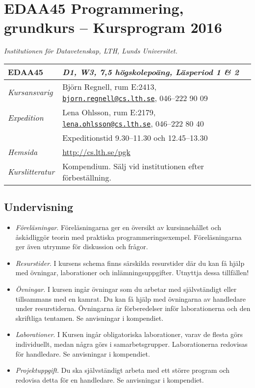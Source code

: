 \documentclass[a4paper,12pt,oneside]{memoir}
\newcommand{\YEAR}{2016}
\begin{document}
\section*{EDAA45 Programmering, grundkurs  -- Kursprogram \YEAR}
\emph{Institutionen för Datavetenskap, LTH, Lunds Universitet.}\\

\begin{longtable}[l]{ll}
\toprule
\textbf{EDAA45} & \textit {D1, W3, 7,5 högskolepoäng, Läsperiod 1 \& 2} \tabularnewline
\midrule
\endhead
\emph{Kursansvarig}   & Björn Regnell, rum E:2413,
                        \href{mailto:bjorn.regnell@cs.lth.se}
                        {\nolinkurl{bjorn.regnell@cs.lth.se}},
                        046--222 90 09\tabularnewline
\emph{Expedition}     & Lena Ohlsson, rum E:2179, 
                        \href{mailto:lena.ohlsson@cs.lth.se}
                        {\nolinkurl{lena.ohlsson@cs.lth.se}}, 
                        046--222 80 40\tabularnewline
                      & Expeditionstid 9.30--11.30 och 12.45--13.30\tabularnewline
\emph{Hemsida}        & \url{http://cs.lth.se/pgk}\tabularnewline
\emph{Kurslitteratur} & Kompendium. Sälj vid institutionen efter förbeställning.\tabularnewline

\bottomrule
\end{longtable}

\subsection{Undervisning}\label{undervisning}

\begin{itemize}
\item
  \emph{Föreläsningar}. Föreläsningarna ger en översikt av
  kursinnehållet och åskådliggör teorin med praktiska
  programmeringsexempel. Föreläsningarna ger även utrymme för diskussion
  och frågor.
\item
  \emph{Resurstider}. I kursens schema finns särskilda resurstider
  där du kan få hjälp med övningar, laborationer och
  inlämningsuppgifter. Utnyttja dessa tillfällen!
\item
  \emph{Övningar}. I kursen ingår övningar som du arbetar med
  självständigt eller tillsammans med en kamrat. 
  Du kan få hjälp med övningarna av handledare under resurstiderna. 
  Övningarna är förberedelser inför laborationerna och den skriftliga tentamen. 
  Se anvisningar i kompendiet.
\item
  \emph{Laborationer}. I Kursen ingår obligatoriska laborationer,
  varav de flesta görs individuellt, medan några görs i samarbetsgrupper.
  Laborationerna redovisas för handledare. 
  Se anvisningar i kompendiet.
\item
  \emph{Projektuppgift}. Du ska självständigt arbeta med ett större
  program och redovisa detta för en handledare. Se anvisningar i
  kompendiet.
\end{itemize}
\end{document}
